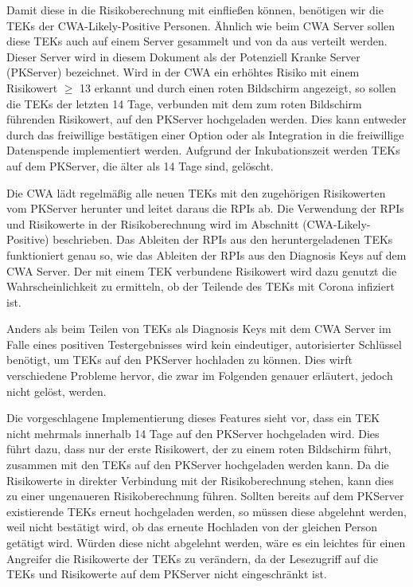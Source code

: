 \documentclass[conference]{IEEEtran}
\begin{document}
Damit diese in die Risikoberechnung mit einfließen können, benötigen wir die TEKs der CWA-Likely-Positive Personen.
Ähnlich wie beim CWA Server sollen diese TEKs auch auf einem Server gesammelt und von da aus verteilt werden.
Dieser Server wird in diesem Dokument als der Potenziell Kranke Server (PKServer) bezeichnet.
Wird in der CWA ein erhöhtes Risiko mit einem Risikowert $\geq$ 13 erkannt und durch einen roten Bildschirm angezeigt, so sollen die TEKs der letzten 14 Tage, verbunden mit dem zum roten Bildschirm führenden Risikowert, auf den PKServer hochgeladen werden.
Dies kann entweder durch das freiwillige bestätigen einer Option oder als Integration in die freiwillige Datenspende implementiert werden.
Aufgrund der Inkubationszeit werden TEKs auf dem PKServer, die älter als 14 Tage sind, gelöscht.

Die CWA lädt regelmäßig alle neuen TEKs mit den zugehörigen Risikowerten vom PKServer herunter und leitet daraus die RPIs ab.
Die Verwendung der RPIs und Risikowerte in der Risikoberechnung wird im Abschnitt (CWA-Likely-Positive) beschrieben.
Das Ableiten der RPIs aus den heruntergeladenen TEKs funktioniert genau so, wie das Ableiten der RPIs aus den Diagnosis Keys auf dem CWA Server.
Der mit einem TEK verbundene Risikowert wird dazu genutzt die Wahrscheinlichkeit zu ermitteln, ob der Teilende des TEKs mit Corona infiziert ist.

Anders als beim Teilen von TEKs als Diagnosis Keys mit dem CWA Server im Falle eines positiven Testergebnisses wird kein eindeutiger, autorisierter Schlüssel benötigt, um TEKs auf den PKServer hochladen zu können.
Dies wirft verschiedene Probleme hervor, die zwar im Folgenden genauer erläutert, jedoch nicht gelöst, werden.

Die vorgeschlagene Implementierung dieses Features sieht vor, dass ein TEK nicht mehrmals innerhalb 14 Tage auf den PKServer hochgeladen wird.
Dies führt dazu, dass nur der erste Risikowert, der zu einem roten Bildschirm führt, zusammen mit den TEKs auf den PKServer hochgeladen werden kann.
Da die Risikowerte in direkter Verbindung mit der Risikoberechnung stehen, kann dies zu einer ungenaueren Risikoberechnung führen.
Sollten bereits auf dem PKServer existierende TEKs erneut hochgeladen werden, so müssen diese abgelehnt werden, weil nicht bestätigt wird, ob das erneute Hochladen von der gleichen Person getätigt wird.
Würden diese nicht abgelehnt werden, wäre es ein leichtes für einen Angreifer die Risikowerte der TEKs zu verändern, da der Lesezugriff auf die TEKs und Risikowerte auf dem PKServer nicht eingeschränkt ist.
\end{document}
